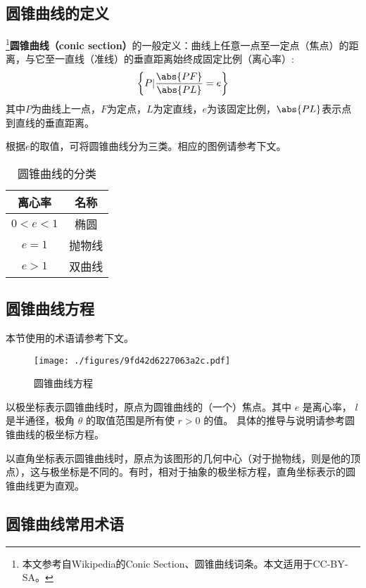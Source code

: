 
\begin{issues}
\issueDraft
\end{issues}

\subsection{圆锥曲线的定义}
\footnote{本文参考自Wikipedia的Conic Section、圆锥曲线词条。本文适用于CC-BY-SA。}\textbf{圆锥曲线（conic section）}的一般定义：曲线上任意一点至一定点（焦点）的距离，与它至一直线（准线）的垂直距离始终成固定比例（离心率）:
\begin{equation}
\left \{P \vert \frac{\abs{PF}}{\abs{PL}}=e \right \}
\end{equation}
其中$P$为曲线上一点，$F$为定点，$L$为定直线，$e$为该固定比例，$\abs{PL}$表示点到直线的垂直距离。

根据$e$的取值，可将圆锥曲线分为三类。相应的图例请参考下文。
\begin{table}[ht]
\centering
\caption{圆锥曲线的分类}\label{tab_conic_2}
\begin{tabular}{|c|c|}
\hline
离心率 & 名称\\
\hline
$0<e<1$ & 椭圆\\
\hline
$e=1$ & 抛物线\\
\hline
$e>1$ & 双曲线\\
\hline
\end{tabular}
\end{table}

\subsection{圆锥曲线方程}
本节使用的术语请参考下文。
\begin{figure}[ht]
\centering
\texttt{[image: ./figures/9fd42d6227063a2c.pdf]}
\caption{圆锥曲线方程} \label{fig_conic_1}
\end{figure}

以极坐标表示圆锥曲线时，原点为圆锥曲线的（一个）焦点。其中 $e$ 是离心率， $l$ 是半通径，极角 $\theta$ 的取值范围是所有使 $r>0$ 的值。 
具体的推导与说明请参考圆锥曲线的极坐标方程。

以直角坐标表示圆锥曲线时，原点为该图形的几何中心（对于抛物线，则是他的顶点），这与极坐标是不同的。有时，相对于抽象的极坐标方程，直角坐标表示的圆锥曲线更为直观。

\subsection{圆锥曲线常用术语}

